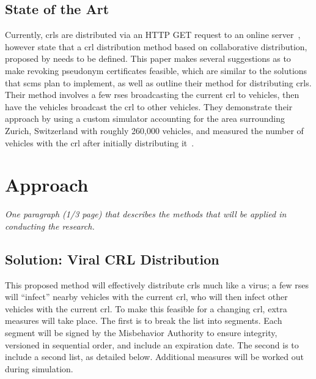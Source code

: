 \documentclass {article}
\newcommand{\sechint}[1]{\small{\emph{#1}} \bigskip}
\begin{document}
\subsection{State of the Art}
Currently, \gls{crl}s are distributed via an HTTP GET request to an online server~\autocite{brecht_scms_nodate}, however \autocite{brecht_security_2018} state that a \gls{crl} distribution method based on collaborative distribution, proposed by \autocite{haas_efficient_2011} needs to be defined. This paper makes several suggestions as to make revoking pseudonym certificates feasible, which are similar to the solutions that \gls{scms} plan to implement, as well as outline their method for distributing \gls{crl}s. Their method involves a few \gls{rse}s broadcasting the current \gls{crl} to vehicles, then have the vehicles broadcast the \gls{crl} to other vehicles. They demonstrate their approach by using a custom simulator accounting for the area surrounding Zurich, Switzerland with roughly 260,000 vehicles, and measured the number of vehicles with the \gls{crl} after initially distributing it~\autocite{haas_efficient_2011}.

\section{Approach}{\sechint{One paragraph (1/3 page) that describes the methods that will be applied in conducting the research.}}

\subsection{Solution: Viral CRL Distribution}
This proposed method will effectively distribute \gls{crl}s much like a virus; a few \gls{rse}s will ``infect'' nearby vehicles with the current \gls{crl}, who will then infect other vehicles with the current \gls{crl}. To make this feasible for a changing \gls{crl}, extra measures will take place. The first is to break the list into segments. Each segment will be signed by the Misbehavior Authority to ensure integrity, versioned in sequential order, and include an expiration date. The second is to include a second list, as detailed below. Additional measures will be worked out during simulation.
\end{document}
